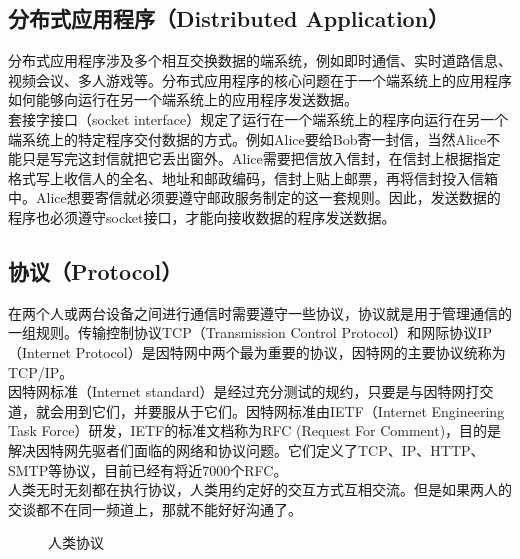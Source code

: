 \vspace{0.5cm}

\subsection{分布式应用程序（Distributed Application）}

分布式应用程序涉及多个相互交换数据的端系统，例如即时通信、实时道路信息、视频会议、多人游戏等。分布式应用程序的核心问题在于一个端系统上的应用程序如何能够向运行在另一个端系统上的应用程序发送数据。\\

套接字接口（socket interface）规定了运行在一个端系统上的程序向运行在另一个端系统上的特定程序交付数据的方式。例如Alice要给Bob寄一封信，当然Alice不能只是写完这封信就把它丢出窗外。Alice需要把信放入信封，在信封上根据指定格式写上收信人的全名、地址和邮政编码，信封上贴上邮票，再将信封投入信箱中。Alice想要寄信就必须要遵守邮政服务制定的这一套规则。因此，发送数据的程序也必须遵守socket接口，才能向接收数据的程序发送数据。\\

\subsection{协议（Protocol）}

在两个人或两台设备之间进行通信时需要遵守一些协议，协议就是用于管理通信的一组规则。传输控制协议TCP（Transmission Control Protocol）和网际协议IP（Internet Protocol）是因特网中两个最为重要的协议，因特网的主要协议统称为TCP/IP。\\

因特网标准（Internet standard）是经过充分测试的规约，只要是与因特网打交道，就会用到它们，并要服从于它们。因特网标准由IETF（Internet Engineering Task Force）研发，IETF的标准文档称为RFC (Request For Comment)，目的是解决因特网先驱者们面临的网络和协议问题。它们定义了TCP、IP、HTTP、SMTP等协议，目前已经有将近7000个RFC。\\

人类无时无刻都在执行协议，人类用约定好的交互方式互相交流。但是如果两人的交谈都不在同一频道上，那就不能好好沟通了。\\

\begin{figure}[H]
    \centering
    \caption{人类协议}
\end{figure}

